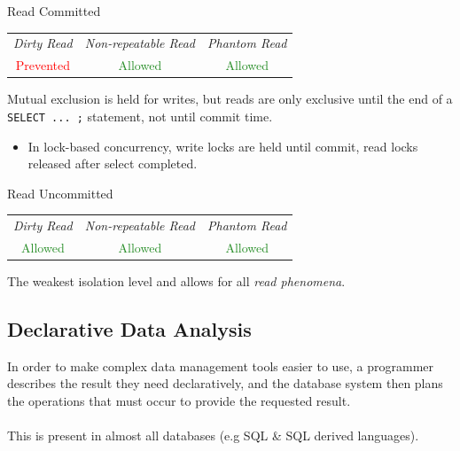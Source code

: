 \begin{definitionbox}{Read Committed}
    \begin{center}
        \begin{tabular}{c | c | c}
            \textit{Dirty Read}        & \textit{Non-repeatable Read}     & \textit{{Phantom Read}}          \\
            \textcolor{red}{Prevented} & \textcolor{ForestGreen}{Allowed} & \textcolor{ForestGreen}{Allowed} \\
        \end{tabular}
    \end{center}
    Mutual exclusion is held for writes, but reads are only exclusive until the end of a \texttt{SELECT ... ;} statement, not until commit time.
    \begin{itemize}
        \item In lock-based concurrency, write locks are held until commit, read locks released after select completed.
    \end{itemize}
\end{definitionbox}
\begin{definitionbox}{Read Uncommitted}
    \begin{center}
        \begin{tabular}{c | c | c}
            \textit{Dirty Read}              & \textit{Non-repeatable Read}     & \textit{{Phantom Read}}          \\
            \textcolor{ForestGreen}{Allowed} & \textcolor{ForestGreen}{Allowed} & \textcolor{ForestGreen}{Allowed} \\
        \end{tabular}
    \end{center}
    The weakest isolation level and allows for all \textit{read phenomena}.
\end{definitionbox}

\subsection{Declarative Data Analysis}
In order to make complex data management tools easier to use, a programmer describes the result
they need declaratively, and the database system then plans the operations that must occur to
provide the requested result.
\\
\\ This is present in almost all databases (e.g SQL \& SQL derived languages).
